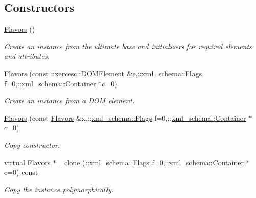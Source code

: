 \subsection*{Constructors}
\begin{DoxyCompactItemize}
\item 
\hypertarget{classopenstack_1_1xml_1_1Flavors_a3adb4424dafc0fb910cc3fb37b405df2}{
\hyperlink{classopenstack_1_1xml_1_1Flavors_a3adb4424dafc0fb910cc3fb37b405df2}{Flavors} ()}
\label{classopenstack_1_1xml_1_1Flavors_a3adb4424dafc0fb910cc3fb37b405df2}

\begin{DoxyCompactList}\small\item\em Create an instance from the ultimate base and initializers for required elements and attributes. \item\end{DoxyCompactList}\item 
\hyperlink{classopenstack_1_1xml_1_1Flavors_a79a93aac630290f2eea1385a0465db79}{Flavors} (const ::xercesc::DOMElement \&e,::\hyperlink{namespacexml__schema_affb4c227cbd9aa7453dd1dc5a1401943}{xml\_\-schema::Flags} f=0,::\hyperlink{namespacexml__schema_a333dea2213742aea47a37532dec4ec27}{xml\_\-schema::Container} $\ast$c=0)
\begin{DoxyCompactList}\small\item\em Create an instance from a DOM element. \item\end{DoxyCompactList}\item 
\hyperlink{classopenstack_1_1xml_1_1Flavors_ae00dba8e0837ccb13f68df2fd9fc9a49}{Flavors} (const \hyperlink{classopenstack_1_1xml_1_1Flavors}{Flavors} \&x,::\hyperlink{namespacexml__schema_affb4c227cbd9aa7453dd1dc5a1401943}{xml\_\-schema::Flags} f=0,::\hyperlink{namespacexml__schema_a333dea2213742aea47a37532dec4ec27}{xml\_\-schema::Container} $\ast$c=0)
\begin{DoxyCompactList}\small\item\em Copy constructor. \item\end{DoxyCompactList}\item 
virtual \hyperlink{classopenstack_1_1xml_1_1Flavors}{Flavors} $\ast$ \hyperlink{classopenstack_1_1xml_1_1Flavors_adf6cfbb5e6cb8a7a35f30d33557cdf35}{\_\-clone} (::\hyperlink{namespacexml__schema_affb4c227cbd9aa7453dd1dc5a1401943}{xml\_\-schema::Flags} f=0,::\hyperlink{namespacexml__schema_a333dea2213742aea47a37532dec4ec27}{xml\_\-schema::Container} $\ast$c=0) const 
\begin{DoxyCompactList}\small\item\em Copy the instance polymorphically. \item\end{DoxyCompactList}\end{DoxyCompactItemize}


